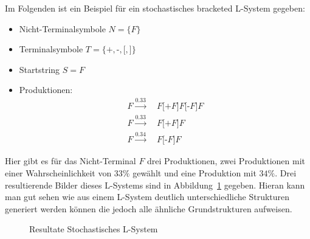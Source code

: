 Im Folgenden ist ein Beispiel für ein stochastisches bracketed L-System gegeben:
\begin{itemize}
    \item Nicht-Terminalsymbole $N=\{F\}$
    \item Terminalsymbole $T=\{\texttt{+},\texttt{-},\texttt{[},\texttt{]}\}$
    \item Startstring $S=F$
    \item Produktionen:
    \begin{align*}
        F\xrightarrow{0.33} & ~F\texttt{[+}F\texttt{]}F\texttt{[-}F\texttt{]} F \\
        F\xrightarrow{0.33} & ~F\texttt{[+}F\texttt{]} F                         \\
        F\xrightarrow{0.34} & ~F\texttt{[-}F\texttt{]} F
    \end{align*}
\end{itemize}

Hier gibt es für das Nicht-Terminal $F$ drei Produktionen, zwei Produktionen mit einer Wahrscheinlichkeit von $33\%$ gewählt und eine Produktion mit $34\%$.
Drei resultierende Bilder dieses L-Systems sind in Abbildung~\ref{fig:Stochastic} gegeben.
Hieran kann man gut sehen wie aus einem L-System deutlich unterschiedliche Strukturen generiert werden können die jedoch alle ähnliche Grundstrukturen aufweisen.
\begin{figure}[ht]
    \begin{subfigure}[t]{.25\textwidth}
        \centering
        
    \end{subfigure}
    \hfill
    \begin{subfigure}[t]{.25\textwidth}
        \centering
        
    \end{subfigure}
    \hfill
    \begin{subfigure}[t]{.25\textwidth}
        \centering
        
    \end{subfigure}
    \caption{Resultate Stochastisches L-System}\label{fig:Stochastic}
\end{figure}


